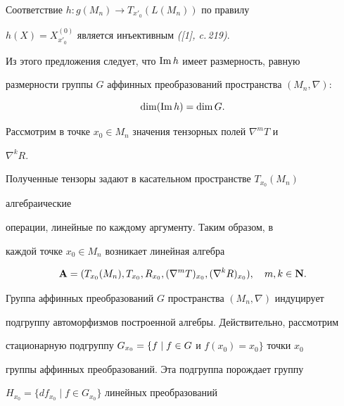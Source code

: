\begin{props} 


Соответствие $h:g(M_n)\to T_{x'_0}(L(M_n))$ по правилу 


$h(X)=X^{(0)}_{x'_0}$ является инъективным {\em ([1], c.\,219)}. 


\end{props} 


 


 


Из этого предложения следует, что $\operatorname{Im} h$ имеет размерность, равную  


размерности группы $G$ аффинных преобразований пространства $(M_n,\nabla)$: 


$$ 


\dim(\im h)=\dim G. 


$$ 


 


 


Рассмотрим в точке $x_0\in M_n$ значения тензорных полей $\nabla^m T$ и 


$\nabla^k R$. 


Полученные тензоры задают в касательном пространстве $T_{x_0}(M_n)$ 


алгебраические  


операции, линейные по каждому аргументу. Таким образом, в  


каждой точке $x_0\in M_n$ возникает линейная алгебра 


$$ 


\bold A=(T_{x_0}(M_n),T_{x_0},R_{x_0},(\nabla^m T)_{x_0}, 


(\nabla^k R)_{x_0}),\quad m,k\in\bold N. 


$$ 


 


Группа аффинных преобразований $G$ пространства $(M_n,\nabla)$ индуцирует  


подгруппу автоморфизмов построенной алгебры. Действительно, рассмотрим  


стационарную подгруппу $G_{x_0}=\linebreak


\{f\mid f\in G$ и $f(x_0)=x_0\}$ точки $x_0$ 


группы аффинных преобразований. Эта подгруппа порождает группу 


$H_{x_0}=\{df_{x_0}\mid f\in G_{x_0}\}$ линейных преобразований 


